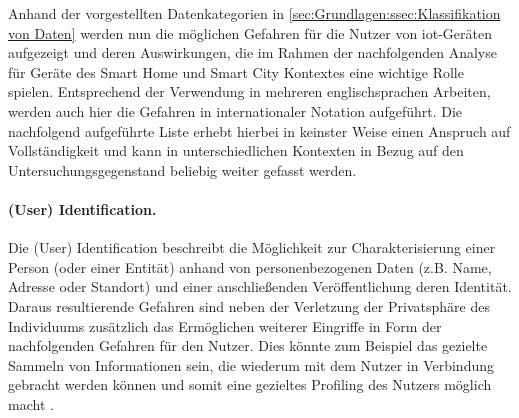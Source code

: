 Anhand der vorgestellten Datenkategorien in \ref{sec:Grundlagen:ssec:Klassifikation von Daten} werden nun die möglichen Gefahren für die Nutzer von \ac{iot}-Geräten aufgezeigt und deren Auswirkungen, die im Rahmen der nachfolgenden Analyse für Geräte des Smart Home und Smart City Kontextes eine wichtige Rolle spielen. Entsprechend der Verwendung in mehreren englischsprachen Arbeiten, werden auch hier die Gefahren in internationaler Notation aufgeführt. Die nachfolgend aufgeführte Liste erhebt hierbei in keinster Weise einen Anspruch auf Vollständigkeit und kann in unterschiedlichen Kontexten in Bezug auf den Untersuchungsgegenstand beliebig weiter gefasst werden.


\paragraph{(User) Identification.}
\label{sec:Grundlagen:para:User Identification}
Die (User) Identification beschreibt die Möglichkeit zur Charakterisierung einer Person (oder einer Entität) anhand von personenbezogenen Daten (z.B. Name, Adresse oder Standort) und einer anschließenden Veröffentlichung deren Identität. Daraus resultierende Gefahren sind neben der Verletzung der Privatsphäre des Individuums zusätzlich das Ermöglichen weiterer Eingriffe in Form der nachfolgenden Gefahren für den Nutzer. Dies könnte zum Beispiel das gezielte Sammeln von Informationen sein, die wiederum mit dem Nutzer in Verbindung gebracht werden können und somit eine gezieltes Profiling des Nutzers möglich macht \cite{Seliem2018}.


